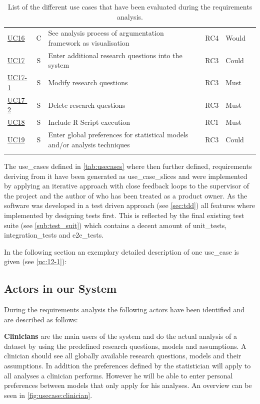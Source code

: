 \begin{landscape}
\begin{longtable}{ l c p{8cm} l l p{3cm} }
		\href{https://trello.com/c/3FCcFdmm}{UC16}  &   C & 	See analysis process of argumentation framework as visualisation & RC4 & Would	&    \\
		\href{https://trello.com/c/Hv2xe2UW}{UC17}  &   S & 	Enter additional research questions into the system & RC3 &Could& \\
		\href{https://trello.com/c/w1YiIgU7}{UC17-1}&   S & 	Modify research questions&RC3 & Must &  \\
		\href{https://trello.com/c/UbT5mtDx}{UC17-2}&   S & 	Delete research questions&RC3&Must& \\
		\href{https://trello.com/c/dpLHOxbB}{UC18}  &   S & 	Include R Script execution	 & RC1 & Must & \\
		\href{https://trello.com/c/bZHdWpkt}{UC19}  &   S & 	Enter global preferences for statistical models and/or analysis techniques& RC3 & Could &	 \\

		\caption{List of the different use cases that have been evaluated during the requirements analysis.}	
		\label{tab:usecases}
	\end{longtable}
\end{landscape}

The \glspl{use_case} defined in \autoref{tab:usecases} where then further defined, requirements deriving from it have been generated as \glspl{use_case_slice} and were implemented by applying an iterative approach with close feedback loops to the supervisor of the project and the author of \cite{sassoon2014,sassoon2016, sassoon2016CD} who has been treated as a product owner. As the software was developed in a test driven approach (see \autoref{sec:tdd}) all features where implemented by designing tests first. This is reflected by the final existing test suite (see \autoref{sub:test_suit}) which contains a decent amount of \glspl{unit_test}, \glspl{integration_test} and \glspl{e2e_test}.

In the following section an exemplary detailed description of one \gls{use_case} is given (see \autoref{uc:12-1}):





\subsection{Actors in our System}
\label{sub:sassoon:actors}
During the requirements analysis the following actors have been identified and are described as follows:

\textbf{Clinicians} are the main users of the system and do the actual analysis of a dataset by using the predefined research questions, models and assumptions. A clinician should see all globally available research questions, models and their assumptions. In addition the preferences defined by the statistician will apply to all analyses a clinician performs. However he will be able to enter personal preferences between models that only apply for his analyses. An overview can be seen in \autoref{fig:usecase:clinician}.

